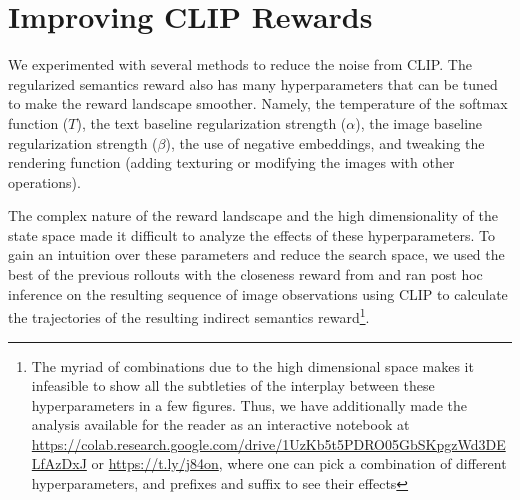 






\section{Improving CLIP Rewards}
\label{sec:improving-rewards}

We experimented with several methods to reduce the noise from CLIP.
The regularized semantics reward also has many hyperparameters that can be tuned to make the reward landscape smoother.
Namely, the temperature of the softmax function (\(T\)), the text baseline regularization strength (\(\alpha\)), the image baseline regularization strength (\(\beta\)), the use of negative embeddings, and tweaking the rendering function (adding texturing or modifying the images with other operations).

The complex nature of the reward landscape and the high dimensionality of the state space made it difficult to analyze the effects of these hyperparameters.
To gain an intuition over these parameters and reduce the search space, we used the best of the previous rollouts with the closeness reward from  and ran post hoc inference on the resulting sequence of image observations using CLIP to calculate the trajectories of the resulting indirect semantics reward\footnote{The myriad of combinations due to the high dimensional space makes it infeasible to show all the subtleties of the interplay between these hyperparameters in a few figures.
Thus, we have additionally made the analysis available for the reader as an interactive notebook at \url{https://colab.research.google.com/drive/1UzKb5t5PDRO05GbSKpgzWd3DELfAzDxJ} or \url{https://t.ly/j84on}, where one can pick a combination of different hyperparameters, and prefixes and suffix to see their effects}.

